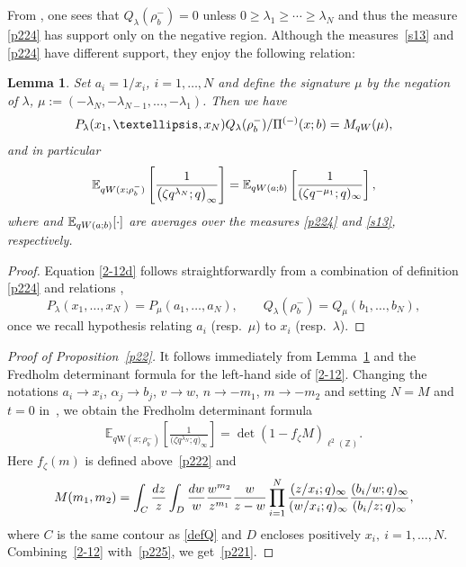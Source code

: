 \documentclass[11pt]{article}
\numberwithin{equation}{section}
\numberwithin{equation}{section}
\newtheorem{Lemma}[Theorem]{Lemma}
\newcommand{\E}[1]{\widetilde{e}_{#1}}
\def\E{\mathbb{E}}
\def\i{\infty}
\def\l{\lambda}
\def\Z{\mathbb{Z}}
\begin{document}
From \cite[Lemma 3.3, equation~(3.15)]{ImamuraSasamoto2019qTASEPtheta}, one sees that $Q_{\l}(\rho_b^-)=0$ unless
$0\ge \l_1\ge\cdots \ge \l_N$ and thus the measure
\eqref{p224} has support only on the negative region. Although the measures~\eqref{s13} and \eqref{p224} have different support, they enjoy the following relation:
\begin{Lemma} \label{l24}
Set $a_i=1/x_i$, $i=1,\dots,N$ and define the signature $\mu$ by the negation of $\l$,
$\mu:=(-\l_N,-\l_{N-1},\dots,-\l_1)$.
 Then we have
\begin{align}
\label{2-12d}
 P_{\l}(x_1,\dots,x_N)Q_{\l}(\rho^{-}_b)/\Pi^{(-)}(x;b)
=
M_{q{\rm W}}(\mu),
 \end{align}
 and in particular
\begin{align}
\label{2-12}
 \E_{q{\rm W}(x;\rho_b^-)}\left[\frac{1}{\big(\zeta q^{\l_N};q\big)_{\i}}\right]
 =
 \E_{q{\rm W}(a;b)}\left[\frac{1}{(\zeta q^{-\mu_1};q)_{\i}}\right],
\end{align}
 where \smash{$\E_{q{\rm W}(x;\rho_b^-)}[\cdot]$}
 and $\E_{q{\rm W}(a;b)}[\cdot]$
 are averages over the measures
 \eqref{p224} and \eqref{s13}, respectively.
\end{Lemma}
\begin{proof}
 Equation \eqref{2-12d} follows straightforwardly from a combination of definition \eqref{p224}
 and relations \cite[equations~(3.14) and (3.15)]{ImamuraSasamoto2019qTASEPtheta},
 \[%
 P_{\l}(x_1,\dots,x_N)=P_{\mu} (a_1,\dots,a_N),
 \qquad
 Q_{\l}(\rho^-_b)=Q_{\mu}(b_1,\dots,b_N),
 \]
 once we recall hypothesis relating $a_i$ (resp.\ $\mu$)
 to $x_i$ (resp.\ $\l$).
\end{proof}

\begin{proof}[Proof of Proposition~\ref{p22}]
 It follows immediately from Lemma~\ref{l24}
 and the Fredholm determinant formula
 for the left-hand side of \eqref{2-12}.
 Changing the notations $a_i\rightarrow x_i$,
 $\alpha_j\rightarrow b_j$,
 $v\rightarrow w$,
 $n\rightarrow -m_1$, $m\rightarrow -m_2$
 and setting $N=M$ and $t=0$
 in~\cite[equation~(4.37)]{ImamuraSasamoto2019qTASEPtheta},
 we obtain the Fredholm determinant formula
\begin{align}
\label{p225}
\E_{q\text{W}(x;\rho_b^-)}\left[\frac{1}{\big(\zeta q^{\l_N};q\big)_{\i}}\right]
=
\det(1-f_{\zeta} M)_{\ell^2(\Z)}.
\end{align}
Here $f_{\zeta}(m)$ is defined above~\eqref{p222}
and
\begin{align*}%
M(m_1,m_2)=
\int_C\frac{{\rm d}z}{z}\int_{D}\frac{{\rm d}w}{w}
\frac{w^{m_2}}{z^{m_1}}
\frac{w}{z-w}
\prod_{i=1}^N
\frac{(z/x_i;q)_{\i}}{(w/x_i;q)_{\i}}
\frac{(b_i/w;q)_{\i}}{(b_i/z;q)_{\i}},
\end{align*}
where $C$ is the same contour as \eqref{defQ} and $D$ encloses positively
$x_i,~i=1,\dots,N$.
Combining~\eqref{2-12} with~\eqref{p225},
we get~\eqref{p221}.
\end{proof}
\end{document}

